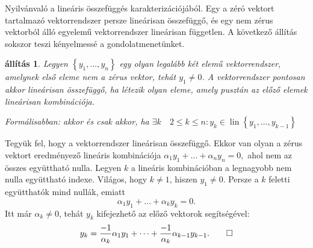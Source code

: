 \documentclass[9pt, a4paper, showtrims]{memoir}
\makeatletter
\renewenvironment{proof}[1][\proofname]
    {\par\pushQED{\qed}%
    \normalfont \topsep6\p@\@plus6\p@\relax
    \trivlist
    \item[\hskip\labelsep
        \itshape
    #1\@addpunct{:}]\ignorespaces}
    {\popQED\endtrivlist\@endpefalse}
\theoremstyle{plain}
\newtheorem{proposition}{állítás}[chapter]
\theoremstyle{remark}
\theoremstyle{definition}
\DeclareMathOperator{\lin}{lin}
\makeatother
\begin{document}
\begin{proof}
	Nyilvánvaló a lineáris összefüggés karakterizációjából.
\end{proof}
Egy a zéró vektort tartalmazó vektorrendszer persze lineárisan összefüggő,
és egy nem zérus vektorból álló egyelemű vektorrendszer lineárisan független.
A következő állítás sokszor teszi kényelmessé a gondolatmenetünket.
\begin{proposition}
	Legyen $\left\{ y_1,\ldots,y_n \right\}$ egy olyan legalább két elemű vektorrendszer,
	amelynek első eleme nem a zérus vektor, tehát $y_1\neq 0$.
	A vektorrendszer pontosan akkor lineárisan összefüggő,
	ha létezik olyan eleme,
	amely pusztán az előző elemek lineárisan kombinációja.

	Formálisabban: akkor és csak akkor,
	ha
	$\exists k\quad 2\leq k\leq n : y_k\in\lin\left\{ y_1,\ldots,y_{k-1} \right\}$
\end{proposition}
\begin{proof}
	Tegyük fel, hogy a vektorrendszer lineárisan összefüggő.
	Ekkor van olyan a zérus vektort eredményező lineáris kombinációja
	\(
	\alpha_1y_1+\dots+\alpha_ny_n=0,
	\)
	ahol nem az összes együttható nulla.
	Legyen $k$ a lineáris kombinációban a legnagyobb nem nulla együttható indexe.
	Világos, hogy $k\neq 1$,
	hiszen $y_1\neq 0$.
	Persze a $k$ feletti együtthatók mind nullák,
	emiatt
	\[
		\alpha_1y_1+\dots+\alpha_ky_k=0.
	\]
	Itt már $\alpha_k\neq 0$, tehát $y_k$ kifejezhető az előző vektorok segítségével:
	\[
		y_k=
		\frac{-1}{\alpha_k}\alpha_1y_1+\dots+\frac{-1}{\alpha_{k}}\alpha_{k-1}y_{k-1}.\qedhere
	\]
\end{proof}
\end{document}
